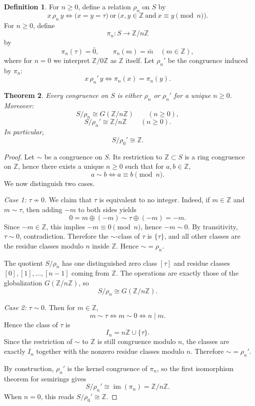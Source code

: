 \documentclass[11pt]{article}
\newtheorem{theorem}{Theorem}[section]
\theoremstyle{definition}
\newtheorem{definition}[theorem]{Definition}
\newcommand{\Z}{\mathbb Z}
\newcommand{\taup}{\tau}
\newcommand{\ideal}[1]{I_{#1}}
\begin{document}
\begin{definition}
For \(n\ge0\), define a relation \(\rho_n\) on \(S\) by
\[
x\,\rho_n\,y
\iff
\bigl(x=y=\taup\bigr)
\ \text{or}\ 
\bigl(x,y\in\Z\ \text{and}\ x\equiv y\pmod n\bigr).
\]
For \(n\ge0\), define
\[
\pi_n:S\longrightarrow \Z/n\Z
\]
by
\[
\pi_n(\taup)=\bar 0,
\qquad
\pi_n(m)=\bar m\quad (m\in\Z),
\]
where for \(n=0\) we interpret \(\Z/0\Z\) as \(\Z\) itself.  Let \(\rho_n'\) be the congruence induced by \(\pi_n\):
\[
x\,\rho_n'\,y \iff \pi_n(x)=\pi_n(y).
\]
\end{definition}

\begin{theorem}\label{thm:congruence-classification}
Every congruence on \(S\) is either \(\rho_n\) or \(\rho_n'\) for a unique \(n\ge0\).  Moreover:
\[
S/\rho_n\cong G(\Z/n\Z)
\qquad (n\ge0),
\]
\[
S/\rho_n'\cong \Z/n\Z
\qquad (n\ge0).
\]
In particular,
\[
S/\rho_0'\cong \Z.
\]
\end{theorem}

\begin{proof}
Let \(\sim\) be a congruence on \(S\).  Its restriction to \(\Z\subset S\) is a ring congruence on \(\Z\), hence there exists a unique \(n\ge0\) such that for \(a,b\in\Z\),
\[
a\sim b \iff a\equiv b\pmod n.
\]
We now distinguish two cases.

\emph{Case 1: \(\taup\not\sim 0\).}  We claim that \(\taup\) is equivalent to no integer.  Indeed, if \(m\in\Z\) and \(m\sim\taup\), then adding \(-m\) to both sides yields
\[
0=m\oplus(-m)\sim \taup\oplus(-m)=-m.
\]
Since \(-m\in\Z\), this implies \(-m\equiv 0\pmod n\), hence \(-m\sim0\).  By transitivity, \(\taup\sim0\), contradiction.  Therefore the \(\sim\)-class of \(\taup\) is \(\{\taup\}\), and all other classes are the residue classes modulo \(n\) inside \(\Z\).  Hence \(\sim=\rho_n\).

The quotient \(S/\rho_n\) has one distinguished zero class \([\taup]\) and residue classes \([0],[1],\dots,[n-1]\) coming from \(\Z\).  The operations are exactly those of the globalization \(G(\Z/n\Z)\), so
\[
S/\rho_n\cong G(\Z/n\Z).
\]

\emph{Case 2: \(\taup\sim 0\).}  Then for \(m\in\Z\),
\[
m\sim\taup \iff m\sim 0 \iff n\mid m.
\]
Hence the class of \(\taup\) is
\[
\ideal{n}=n\Z\cup\{\taup\}.
\]
Since the restriction of \(\sim\) to \(\Z\) is still congruence modulo \(n\), the classes are exactly \(\ideal{n}\) together with the nonzero residue classes modulo \(n\).  Therefore \(\sim=\rho_n'\).

By construction, \(\rho_n'\) is the kernel congruence of \(\pi_n\), so the first isomorphism theorem for semirings gives
\[
S/\rho_n'\cong \operatorname{im}(\pi_n)=\Z/n\Z.
\]
When \(n=0\), this reads \(S/\rho_0'\cong\Z\).
\end{proof}
\end{document}

